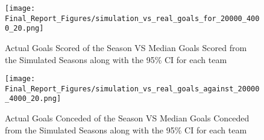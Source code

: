 \documentclass{article}
\begin{document}
\begin{figure*}[!htb]
\centering
\texttt{[image: Final\_Report\_Figures/simulation\_vs\_real\_goals\_for\_20000\_4000\_20.png]}
\caption{Actual Goals Scored of the Season VS Median Goals Scored from the Simulated Seasons along with the 95\% CI for each team}
\label{fig:actual_simulation_goals_for_barplot}
\end{figure*}

\begin{figure*}[!htb]
\centering
\texttt{[image: Final\_Report\_Figures/simulation\_vs\_real\_goals\_against\_20000\_4000\_20.png]}
\caption{Actual Goals Conceded of the Season VS Median Goals Conceded from the Simulated Seasons along with the 95\% CI for each team}
\label{fig:actual_simulation_goals_against_barplot}
\end{figure*}
\end{document}
